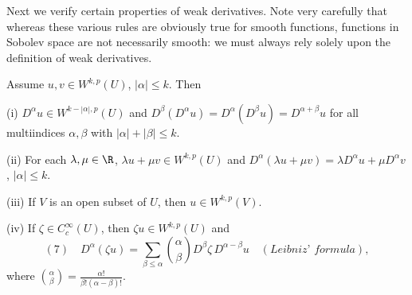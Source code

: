 Next we verify certain properties of weak derivatives. Note very carefully that whereas these various rules are obviously true for smooth functions, functions in Sobolev space are not necessarily smooth: we must always rely solely upon the definition of weak derivatives.

\begin{theorem}
\label{thm:weak-derivative-properties}
Assume $u, v \in W^{k,p}(U)$, $|\alpha| \le k$. Then

(i) $D^{\alpha}u \in W^{k-|\alpha|,p}(U)$ and $D^{\beta}(D^{\alpha}u) = D^{\alpha}(D^{\beta}u) = D^{\alpha+\beta}u$ for all multiindices $\alpha, \beta$ with $|\alpha| + |\beta| \le k$.

(ii) For each $\lambda, \mu \in \R$, $\lambda u + \mu v \in W^{k,p}(U)$ and $D^{\alpha}(\lambda u + \mu v) = \lambda D^{\alpha}u + \mu D^{\alpha}v$, $|\alpha| \le k$.

(iii) If $V$ is an open subset of $U$, then $u \in W^{k,p}(V)$.

(iv) If $\zeta \in C_c^{\infty}(U)$, then $\zeta u \in W^{k,p}(U)$ and
$$(7) \quad D^{\alpha}(\zeta u) = \sum_{\beta \le \alpha} \binom{\alpha}{\beta} D^{\beta}\zeta\, D^{\alpha-\beta}u \quad (\textit{Leibniz' formula}),$$
where $\binom{\alpha}{\beta} = \frac{\alpha!}{\beta!(\alpha-\beta)!}$.
\end{theorem}

